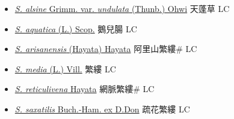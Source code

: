 \begin{itemize}
  \begin{itemize}
        \item[] \href{http://www.theplantlist.org/tpl1.1/search?q=Stellaria+alsine+var.+undulata}{\textit{S. alsine} Grimm. var. \textit{undulata} (Thunb.) Ohwi}   天蓬草 LC
        \item[] \href{http://www.theplantlist.org/tpl1.1/search?q=Stellaria+aquatica}{\textit{S. aquatica} (L.) Scop.}   鵝兒腸 LC
        \item[] \href{http://www.theplantlist.org/tpl1.1/search?q=Stellaria+arisanensis}{\textit{S. arisanensis} (Hayata) Hayata}   阿里山繁縷\# LC
        \item[] \href{http://www.theplantlist.org/tpl1.1/search?q=Stellaria+media}{\textit{S. media} (L.) Vill.}   繁縷 LC
        \item[] \href{http://www.theplantlist.org/tpl1.1/search?q=Stellaria+reticulivena}{\textit{S. reticulivena} Hayata}     網脈繁縷\# LC
        \item[] \href{http://www.theplantlist.org/tpl1.1/search?q=Stellaria+saxatilis}{\textit{S. saxatilis} Buch.-Ham. ex D.Don}   疏花繁縷 LC
  \end{itemize}
  \end{itemize}
